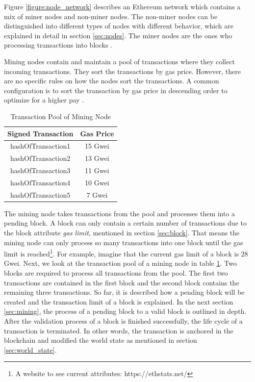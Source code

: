 \clearpage

Figure \ref{figure:node_network} describes an Ethereum network 
which contains a mix of miner nodes and non-miner nodes. 
The non-miner nodes can be distinguished into different types of nodes with different 
behavior, which are explained in detail in section \ref{sec:nodes}. 
The miner nodes are the ones who processing transactions into blocks . 

Mining nodes contain and maintain a pool of transactions where they collect incoming transactions. 
They sort the transactions by gas price. 
However, there are no specific rules on how the nodes sort the transactions. 
A common configuration is to sort the transaction by gas price in descending order to 
optimize for a higher pay .

\begin{longtable}{c|c}
	\caption{Transaction Pool of Mining Node} 
	\label{table:sorted_gas_prices}
	\\
	\textbf{Signed Transaction} & \textbf{Gas Price} \\
	\hline
	hashOfTransaction1 & 15 Gwei \\
	hashOfTransaction2 & 13 Gwei \\
	hashOfTransaction3 & 11 Gwei \\
	hashOfTransaction4 & 10 Gwei \\
	hashOfTransaction5 & 7 Gwei \\
\end{longtable} 

The mining node takes transactions from the pool and processes them into a pending block. 
A block can only contain a certain number of transactions due to the block 
attribute \textit{gas limit}, mentioned in section \ref{sec:block}. 
That means the mining node can only process so many transactions into one 
block until the gas limit is reached\footnote{A website to see 
current attributes: https://ethstats.net/}. For example, 
imagine that the current gas limit of a block is 28 Gwei. 
Next, we look at the transaction pool of a mining node in 
table \ref{table:sorted_gas_prices}. Two blocks are 
required to process all transactions from the pool. The first two transactions 
are contained in the first block and the second block contains the remaining 
three transactions. 
So far, it is described how a pending block will be created and the transaction 
limit of a block is explained. In the next section \ref{sec:mining}, 
the process of a pending block to a valid block is outlined in depth. 
After the validation process of a block is finished successfully, 
the life cycle of a transaction is terminated. In other words, the transaction is anchored 
in the blockchain and modified the world state as mentioned in section \ref{sec:world_state}.

